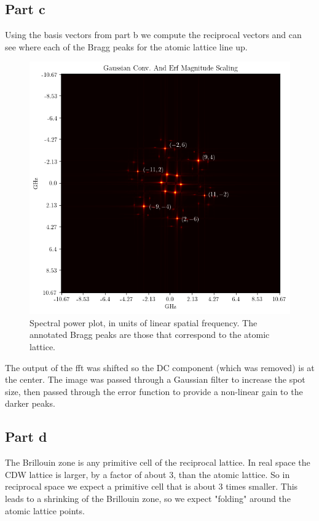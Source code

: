 \subsection*{Part c}
Using the basis vectors from part b we compute the reciprocal vectors and can see where each of the Bragg peaks for the atomic lattice line up.
\begin{figure}[H]
    \centering
    \includegraphics[width=1\linewidth]{Resources//140A//Homework 6/140A Homework 6 Problem 5c.png}
    \caption{Spectral power plot, in units of linear spatial frequency. The annotated Bragg peaks are those that correspond to the atomic lattice.}
    \label{fig:enter-label}
\end{figure}
The output of the fft was shifted so the DC component (which was removed) is at the center. The image was passed through a Gaussian filter to increase the spot size, then passed through the error function to provide a non-linear gain to the darker peaks.
\subsection*{Part d}
The Brillouin zone is any primitive cell of the reciprocal lattice. In real space the CDW lattice is larger, by a factor of about 3, than the atomic lattice. So in reciprocal space we expect a primitive cell that is about 3 times smaller. This leads to a shrinking of the Brillouin zone, so we expect "folding" around the atomic lattice points.

